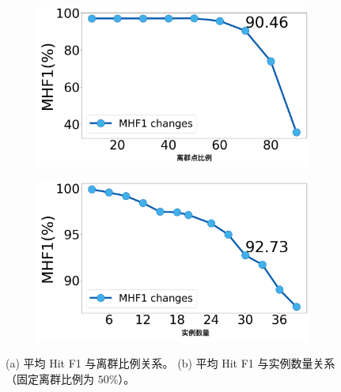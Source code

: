 \begin{figure}[ht]
    \centering
    \begin{subfigure}{0.4\textwidth}
        \centering   
        \includegraphics[width=\linewidth]{images/mhf1_or.png}
          \caption{}
      \end{subfigure}
      \begin{subfigure}{0.4\textwidth}
        \centering   
        \includegraphics[width=\linewidth]{images/mhf1_in.png}
          \caption{}
          \label{fig:multi-instance}
      \end{subfigure} %
    \caption{(a) 平均 Hit F1 与离群比例关系。 (b) 平均 Hit F1 与实例数量关系（固定离群比例为 $50\%$）。}
    \label{fig:detail-mm}
\end{figure}

